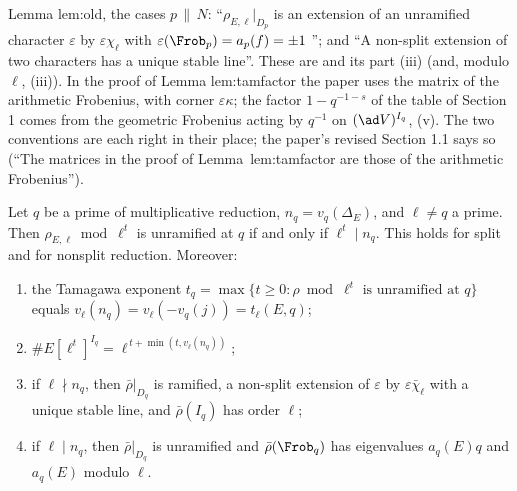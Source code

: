 \begin{paperlink}
Lemma lem:old, the cases $p\,\|\,N$: ``$\rho_{E,\ell}|_{D_p}$ is an extension of an unramified character $\varepsilon$ by $\varepsilon\chi_\ell$ with
$\varepsilon(\Frob_p)=a_p(f)=\pm1$ \cite[Theorem 3.1(e)]{DDT}''; and ``A non-split extension of two characters has a unique stable line''. These are
 and its part (iii) (and, modulo $\ell$, (iii)). In the proof of Lemma lem:tamfactor
the paper uses the matrix of the arithmetic Frobenius, with corner $\varepsilon\kappa$; the factor $1-q^{-1-s}$ of the table of Section 1 comes from
the geometric Frobenius acting by $q^{-1}$ on $(\ad V)^{I_q}$, (v). The two conventions are each right in their place; the paper's revised
Section 1.1 says so (``The matrices in the proof of Lemma~lem:tamfactor are those of the arithmetic Frobenius'').
\end{paperlink}

\begin{lemma}\label{lem:galrep:tamagawa-exp}
Let $q$ be a prime of multiplicative reduction, $n_q=v_q(\Delta_E)$, and $\ell\ne q$ a prime. Then $\rho_{E,\ell}\bmod\ell^t$ is unramified at $q$ if and only
if $\ell^t\mid n_q$. This holds for split and for nonsplit reduction. Moreover:
\begin{enumerate}[label=(\roman*)]
\item the Tamagawa exponent $t_q=\max\{t\ge0:\rho\bmod\ell^t\text{ is unramified at }q\}$ equals $v_\ell(n_q)=v_\ell(-v_q(j))=t_\ell(E,q)$;
\item $\#E[\ell^t]^{I_q}=\ell^{\,t+\min(t,v_\ell(n_q))}$;
\item if $\ell\nmid n_q$, then $\bar\rho|_{D_q}$ is ramified, a non-split extension of $\varepsilon$ by $\varepsilon\bar\chi_\ell$ with a unique stable line, and
$\bar\rho(I_q)$ has order $\ell$;
\item if $\ell\mid n_q$, then $\bar\rho|_{D_q}$ is unramified and $\bar\rho(\Frob_q)$ has eigenvalues $a_q(E)q$ and $a_q(E)$ modulo $\ell$.
\end{enumerate}
\end{lemma}

